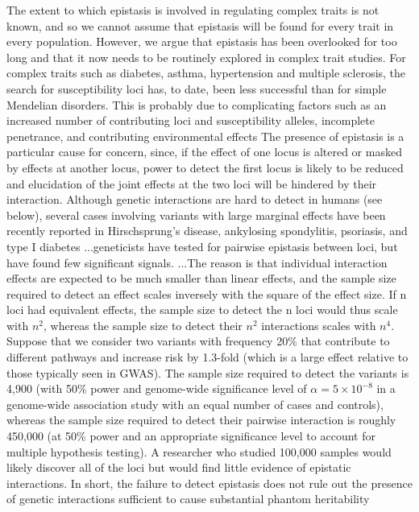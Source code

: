 The extent to which epistasis is involved in regulating complex traits is not known, and so we cannot assume that epistasis will be found for every trait in every population. \cite{carlborg2004epistasis}
However, we argue that epistasis has been overlooked for too long and that it now needs to be routinely explored in complex trait studies.  \cite{carlborg2004epistasis}
For complex traits such as diabetes, asthma, hypertension and multiple sclerosis, the search for susceptibility loci has, to date, been less successful than for simple Mendelian disorders. This is probably due to complicating factors such as an increased number of contributing loci and susceptibility alleles, incomplete penetrance, and contributing environmental effects \cite{cordell2002epistasis}
The presence of epistasis is a particular cause for concern, since, if the effect of one locus is altered or masked by effects at another locus, power to detect the first locus is likely to be reduced and elucidation of the joint effects at the two loci will be hindered by their interaction.  \cite{cordell2002epistasis}
Although genetic interactions are hard to detect in humans (see below), several cases involving variants with large marginal effects have been recently reported in Hirschsprung's disease, ankylosing spondylitis, psoriasis, and type I diabetes  \cite{zuk2012mystery}
...geneticists have tested for pairwise epistasis between loci, but have found few significant signals. \cite{zuk2012mystery}
...The reason is that individual interaction effects are expected to be much smaller than linear effects, and the sample size required to detect an effect scales inversely with the square of the effect size. If n loci had equivalent effects, the sample size to detect the n loci would thus scale with $n^2$, whereas the sample size to detect their $n^2$ interactions scales with $n^4$. \cite{zuk2012mystery}
Suppose that we consider two variants with frequency 20\% that contribute to different pathways and increase risk by 1.3-fold (which is a large effect relative to those typically seen in GWAS). The sample size required to detect the variants is 4,900 (with 50\% power and genome-wide significance level of $\alpha = 5 \times 10^{-8}$ in a genome-wide association study with an equal number of cases and controls), whereas the sample size required to detect their pairwise interaction is roughly 450,000 (at 50\% power and an appropriate significance level to account for multiple hypothesis testing). A researcher who studied 100,000 samples would likely discover all of the loci but would find little evidence of epistatic interactions. \cite{zuk2012mystery}
In short, the failure to detect epistasis does not rule out the presence of genetic interactions sufficient to cause substantial phantom heritability \cite{zuk2012mystery}

